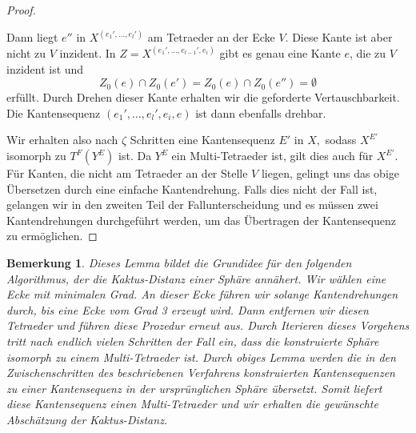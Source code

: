 \documentclass[12pt,titlepage,twoside,cleardoublepage]{article}
\theoremstyle{nummermitklammern}
\newtheorem{bemerkung}[temp]{Bemerkung}
\newtheorem{bemerkung}[zahl]{Bemerkung}
\numberwithin{equation}{section}
\begin{document}
\begin{proof}
\begin{itemize}
Dann liegt $e''$ in $X^{(e_1',\ldots,e_l')}$ am Tetraeder an der Ecke $V.$ Diese Kante ist aber nicht zu $V$ inzident.  
In $Z=X^{(e_1',\ldots,e_{l-1}',e_i)}$ gibt es genau eine Kante $e$, die zu $V$ inzident ist und 
 \[
Z_0(e)\cap Z_0(e')=Z_0(e)\cap Z_0(e'')=\emptyset
\]
erfüllt. Durch Drehen dieser Kante erhalten wir die geforderte Vertauschbarkeit. Die Kantensequenz $(e_1',\ldots,e_l',e_i,e)$ ist dann ebenfalls drehbar.
\end{itemize}
Wir erhalten also nach $\zeta$ Schritten eine Kantensequenz $E'$ in $X,$ sodass $X^{E'}$ isomorph zu $T^F(Y^{E})$ ist. Da $Y^{E}$ ein Multi-Tetraeder ist, gilt dies auch für $X^{E'}.$ Für Kanten, die nicht am Tetraeder an der Stelle $V$ liegen, gelingt uns das obige Übersetzen durch eine einfache Kantendrehung. Falls dies nicht der Fall ist, gelangen wir in den zweiten Teil der Fallunterscheidung und es müssen zwei Kantendrehungen durchgeführt werden, um das Übertragen der Kantensequenz zu ermöglichen.
\end{proof}
\begin{bemerkung}\label{alg}
Dieses Lemma bildet die Grundidee für den folgenden Algorithmus, der die Kaktus-Distanz einer Sphäre annähert. Wir wählen eine Ecke mit minimalen Grad. An dieser Ecke führen wir solange Kantendrehungen durch, bis eine Ecke vom Grad 3 erzeugt wird. Dann entfernen wir diesen Tetraeder und führen diese Prozedur erneut aus. Durch Iterieren dieses Vorgehens tritt nach endlich vielen Schritten der Fall ein, dass die konstruierte Sphäre isomorph zu einem Multi-Tetraeder ist. Durch obiges Lemma werden die in den Zwischenschritten des beschriebenen Verfahrens konstruierten Kantensequenzen zu einer Kantensequenz in der ursprünglichen Sphäre übersetzt. Somit liefert diese Kantensequenz einen Multi-Tetraeder und wir erhalten die gewünschte Abschätzung der Kaktus-Distanz.
\end{bemerkung}
\end{document}
